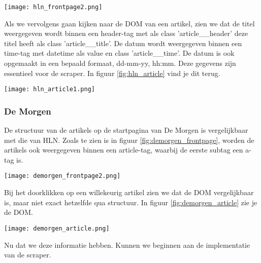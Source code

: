 \begin{center}
    \texttt{[image: hln\_frontpage2.png]}
    \label{fig:hln_frontpage}
\end{center}

Als we vervolgens gaan kijken naar de DOM van een artikel, zien we dat de titel weergegeven wordt binnen een header-tag met als class 'article\_\_header' deze titel heeft als class 'article\_\_title'. De datum wordt weergegeven binnen een time-tag met datetime als value en class 'article\_\_time'. De datum is ook opgemaakt in een bepaald formaat, dd-mm-yy, hh:mm. Deze gegevens zijn essentieel voor de scraper. In figuur \ref{fig:hln_article} vind je dit terug. \\

\begin{center}
    \texttt{[image: hln\_article1.png]}
    \label{fig:hln_article}
\end{center}

\subsubsection{De Morgen}
De structuur van de artikels op de startpagina van De Morgen is vergelijkbaar met die van HLN. Zoals te zien is in figuur \ref{fig:demorgen_frontpage}, worden de artikels ook weergegeven binnen een article-tag, waarbij de eerste subtag een a-tag is.

\begin{center}
    \texttt{[image: demorgen\_frontpage2.png]}
    \label{fig:demorgen_frontpage}
\end{center}

Bij het doorklikken op een willekeurig artikel zien we dat de DOM vergelijkbaar is, maar niet exact hetzelfde qua structuur. In figuur \ref{fig:demorgen_article} zie je de DOM.

\begin{center}
    \texttt{[image: demorgen\_article.png]}
    \label{fig:demorgen_article}
\end{center}

Nu dat we deze informatie hebben. Kunnen we beginnen aan de implementatie van de scraper. 




